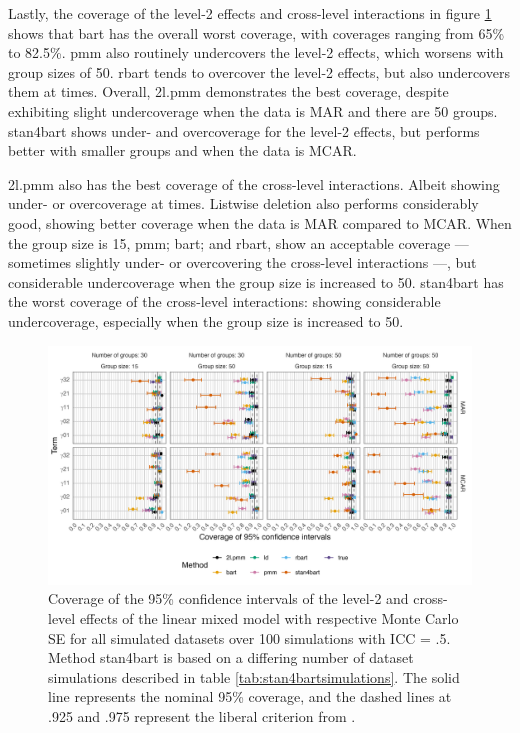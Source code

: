\documentclass[3p,12pt,a4paper]{elsarticle}
\begin{document}
Lastly, the coverage of the level-2 effects and cross-level interactions in figure \ref{fig:coveragelevel2} shows that bart has the overall worst coverage, with coverages ranging from 65\% to 82.5\%. pmm also routinely undercovers the level-2 effects, which worsens with group sizes of 50. rbart tends to overcover the level-2 effects, but also undercovers them at times. Overall, 2l.pmm demonstrates the best coverage, despite exhibiting slight undercoverage when the data is MAR and there are 50 groups. stan4bart shows under- and overcoverage for the level-2 effects, but performs better with smaller groups and when the data is MCAR.

2l.pmm also has the best coverage of the cross-level interactions. Albeit showing under- or overcoverage at times. Listwise deletion also performs considerably good, showing better coverage when the data is MAR compared to MCAR. When the group size is 15, pmm; bart; and rbart, show an acceptable coverage --- sometimes slightly under- or overcovering the cross-level interactions ---, but considerable undercoverage when the group size is increased to 50. stan4bart has the worst coverage of the cross-level interactions: showing considerable undercoverage, especially when the group size is increased to 50.

\begin{figure}[H]
    \centering
    \includegraphics[width=1\textwidth]{coveragelevel2.png}
    \caption{Coverage of the 95\% confidence intervals of the level-2 and cross-level effects of the linear mixed model with respective Monte Carlo SE for all simulated datasets over 100 simulations with ICC = .5. Method stan4bart is based on a differing number of dataset simulations described in table \ref{tab:stan4bartsimulations}. The solid line represents the nominal 95\% coverage, and the dashed lines at .925 and .975 represent the liberal criterion from \citet{bradley1978}.}
    \label{fig:coveragelevel2}
\end{figure}
\end{document}
